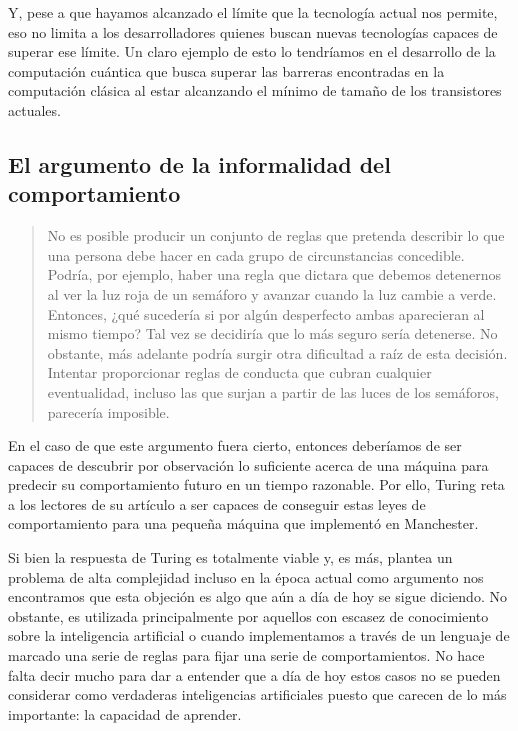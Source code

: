 \documentclass[12pt,a4paper]{article}
\begin{document}
Y, pese a que hayamos alcanzado el límite que la tecnología actual nos permite, eso no limita a los desarrolladores quienes buscan nuevas tecnologías capaces de superar ese límite. Un claro ejemplo de esto lo tendríamos en el desarrollo de la computación cuántica que busca superar las barreras encontradas en la computación clásica al estar alcanzando el mínimo de tamaño de los transistores actuales.


\subsection{El argumento de la informalidad del comportamiento}
\begin{quote}\small No es posible producir un conjunto de reglas que pretenda describir lo que una persona debe hacer en cada grupo de circunstancias concedible. Podría, por ejemplo, haber una regla que dictara que debemos detenernos al ver la luz roja de un semáforo y avanzar cuando la luz cambie a verde. Entonces, ¿qué sucedería si por algún desperfecto ambas aparecieran al mismo tiempo? Tal vez se decidiría que lo más seguro sería detenerse. No obstante, más adelante podría surgir otra dificultad a raíz de esta decisión. Intentar proporcionar reglas de conducta que cubran cualquier eventualidad, incluso las que surjan a partir de las luces de los semáforos, parecería imposible.
\end{quote}

En el caso de que este argumento fuera cierto, entonces deberíamos de ser capaces de descubrir por observación lo suficiente acerca de una máquina para predecir su comportamiento futuro en un tiempo razonable. Por ello, Turing reta a los lectores de su artículo a ser capaces de conseguir estas leyes de comportamiento para una pequeña máquina que implementó en Manchester.

Si bien la respuesta de Turing es totalmente viable y, es más, plantea un problema de alta complejidad incluso en la época actual como argumento nos encontramos que esta objeción es algo que aún a día de hoy se sigue diciendo. No obstante, es utilizada principalmente por aquellos con escasez de conocimiento sobre la inteligencia artificial o cuando implementamos a través de un lenguaje de marcado una serie de reglas para fijar una serie de comportamientos. No hace falta decir mucho para dar a entender que a día de hoy estos casos no se pueden considerar como verdaderas inteligencias artificiales puesto que carecen de lo más importante: la capacidad de aprender.
\end{document}
